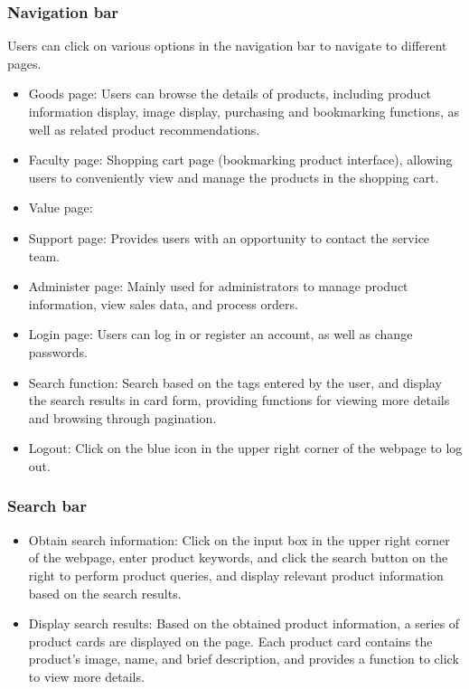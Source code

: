 \documentclass{article}
\begin{document}
\subsubsection{Navigation bar}
Users can click on various options in the navigation bar to navigate to different pages.
\begin{itemize}
    \item Goods page: Users can browse the details of products, including product information display, image display, purchasing and bookmarking functions, as well as related product recommendations.
    \item Faculty page: Shopping cart page (bookmarking product interface), allowing users to conveniently view and manage the products in the shopping cart.
    \item Value page:
    \item Support page: Provides users with an opportunity to contact the service team.
    \item Administer page: Mainly used for administrators to manage product information, view sales data, and process orders.
    \item Login page: Users can log in or register an account, as well as change passwords.
    \item Search function: Search based on the tags entered by the user, and display the search results in card form, providing functions for viewing more details and browsing through pagination.
    \item Logout: Click on the blue icon in the upper right corner of the webpage to log out.
\end{itemize}

\subsubsection{Search bar}
\begin{itemize}
    \item Obtain search information: Click on the input box in the upper right corner of the webpage, enter product keywords, and click the search button on the right to perform product queries, and display relevant product information based on the search results.
    \item Display search results: Based on the obtained product information, a series of product cards are displayed on the page. Each product card contains the product's image, name, and brief description, and provides a function to click to view more details.
\end{itemize}
\end{document}
